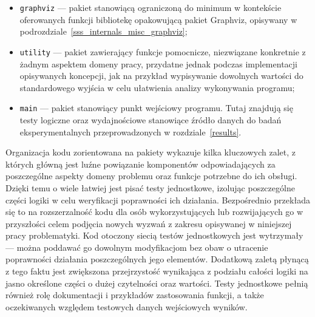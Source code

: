 {\begin{itemize}
    \item \texttt{graphviz} --- pakiet stanowiącą ograniczoną do minimum w kontekście oferowanych funkcji bibliotekę opakowującą pakiet Graphviz, opisywany w podrozdziale~\ref{sss_internals_misc_graphviz};
    \item \texttt{utility} --- pakiet zawierający funkcje pomocnicze, niezwiązane konkretnie z żadnym aspektem domeny pracy, przydatne jednak podczas implementacji opisywanych koncepcji, jak na przykład wypisywanie dowolnych wartości do standardowego wyjścia w celu ułatwienia analizy wykonywania programu;
    \item \texttt{main} --- pakiet stanowiący punkt wejściowy programu. Tutaj znajdują się testy logiczne oraz wydajnościowe stanowiące źródło danych do badań eksperymentalnych przeprowadzonych w rozdziale~\ref{results}.
  \end{itemize}
}
\par{
  Organizacja kodu zorientowana na pakiety wykazuje kilka kluczowych zalet, z których główną jest luźne powiązanie komponentów odpowiadających za poszczególne aspekty domeny problemu oraz funkcje potrzebne do ich obsługi.
  Dzięki temu o wiele łatwiej jest pisać testy jednostkowe, izolując poszczególne części logiki w celu weryfikacji poprawności ich działania. 
  Bezpośrednio przekłada się to na rozszerzalność kodu dla osób wykorzystujących lub rozwijających go w przyszłości celem podjęcia nowych wyzwań z zakresu opisywanej w niniejszej pracy problematyki.
  Kod otoczony siecią testów jednostkowych jest wytrzymały --- można poddawać go dowolnym modyfikacjom bez obaw o utracenie poprawności działania poszczególnych jego elementów.
  Dodatkową zaletą płynącą z tego faktu jest zwiększona przejrzystość wynikająca z podziału całości logiki na jasno określone części o dużej czytelności oraz wartości.
  Testy jednostkowe pełnią również rolę dokumentacji i przykładów zastosowania funkcji, a także oczekiwanych względem testowych danych wejściowych wyników.
}